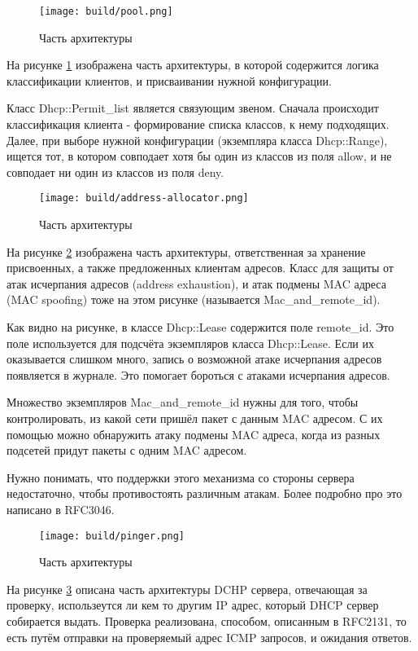 \documentclass[14pt,a4paper]{extarticle}
\begin{document}
\begin{figure}[H]
    \texttt{[image: build/pool.png]}
    \caption{Часть архитектуры}
    \label{fig:pool}
\end{figure}

На рисунке \ref{fig:pool} изображена часть архитектуры, в которой содержится логика классификации клиентов, и присваивании нужной конфигурации.

Класс Dhcp::Permit\_list является связующим звеном.
Сначала происходит классификация клиента - формирование списка классов, к нему подходящих.
Далее, при выборе нужной конфигурации (экземпляра класса Dhcp::Range), ищется тот, в котором совподает хотя бы один из классов из поля allow, и не совподает ни один из классов из поля deny.

\begin{figure}[H]
    \texttt{[image: build/address-allocator.png]}
    \caption{Часть архитектуры}
    \label{fig:address_allocator}
\end{figure}

На рисунке \ref{fig:address_allocator} изображена часть архитектуры, ответственная за хранение присвоенных, а также предложенных клиентам адресов.
Класс для защиты от атак исчерпания адресов (address exhaustion), и атак подмены MAC адреса (MAC spoofing) тоже на этом рисунке (называется Mac\_and\_remote\_id).

Как видно на рисунке, в классе Dhcp::Lease содержится поле remote\_id. Это поле используется для подсчёта экземпляров класса Dhcp::Lease. Если их оказывается слишком много, запись о возможной атаке исчерпания адресов появляется в журнале. Это помогает бороться с атаками исчерпания адресов.

Множество экземпляров Mac\_and\_remote\_id нужны для того, чтобы контролировать, из какой сети пришёл пакет с данным MAC адресом.
С их помощью можно обнаружить атаку подмены MAC адреса, когда из разных подсетей придут пакеты с одним MAC адресом.

Нужно понимать, что поддержки этого механизма со стороны сервера недостаточно, чтобы противостоять различным атакам. Более подробно про это написано в RFC3046.

\begin{figure}[H]
    \texttt{[image: build/pinger.png]}
    \caption{Часть архитектуры}
    \label{fig:pinger}
\end{figure}

На рисунке \ref{fig:pinger} описана часть архитектуры DCHP сервера, отвечающая за проверку, использеутся ли  кем то другим IP адрес, который DHCP сервер собирается выдать. Проверка реализована, способом, описанным в RFC2131, то есть путём отправки на проверяемый адрес ICMP запросов, и ожидания ответов.
\end{document}
